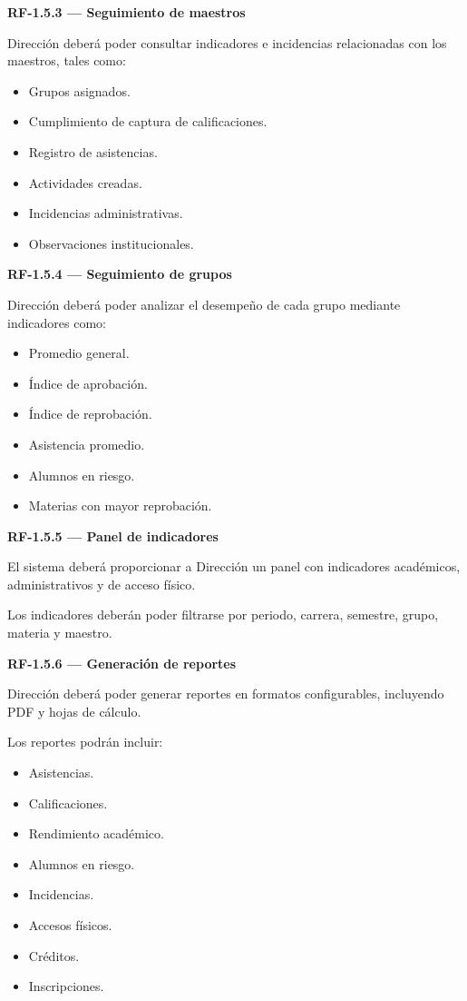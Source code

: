 \documentclass[12pt,a4paper]{article}
\newcommand{\RF}[1]{\textbf{\color{primary}RF-#1}}
\newenvironment{requisito}[1]
{
\begin{center}
\begin{minipage}{0.96\textwidth}
\colorbox{requirement}{
\begin{minipage}{0.94\textwidth}
\textbf{#1}
\end{minipage}
}
\vspace{2mm}
}
{
\end{minipage}
\end{center}
}
\begin{document}
\begin{requisito}{\RF{1.5.3} --- Seguimiento de maestros}
Dirección deberá poder consultar indicadores e incidencias relacionadas con los
maestros, tales como:

\begin{itemize}[leftmargin=*]
\item Grupos asignados.
\item Cumplimiento de captura de calificaciones.
\item Registro de asistencias.
\item Actividades creadas.
\item Incidencias administrativas.
\item Observaciones institucionales.
\end{itemize}
\end{requisito}

\begin{requisito}{\RF{1.5.4} --- Seguimiento de grupos}
Dirección deberá poder analizar el desempeño de cada grupo mediante indicadores
como:

\begin{itemize}[leftmargin=*]
\item Promedio general.
\item Índice de aprobación.
\item Índice de reprobación.
\item Asistencia promedio.
\item Alumnos en riesgo.
\item Materias con mayor reprobación.
\end{itemize}
\end{requisito}

\begin{requisito}{\RF{1.5.5} --- Panel de indicadores}
El sistema deberá proporcionar a Dirección un panel con indicadores académicos,
administrativos y de acceso físico.

Los indicadores deberán poder filtrarse por periodo, carrera, semestre, grupo,
materia y maestro.
\end{requisito}

\begin{requisito}{\RF{1.5.6} --- Generación de reportes}
Dirección deberá poder generar reportes en formatos configurables, incluyendo
PDF y hojas de cálculo.

Los reportes podrán incluir:

\begin{itemize}[leftmargin=*]
\item Asistencias.
\item Calificaciones.
\item Rendimiento académico.
\item Alumnos en riesgo.
\item Incidencias.
\item Accesos físicos.
\item Créditos.
\item Inscripciones.
\end{itemize}
\end{requisito}
\end{document}
